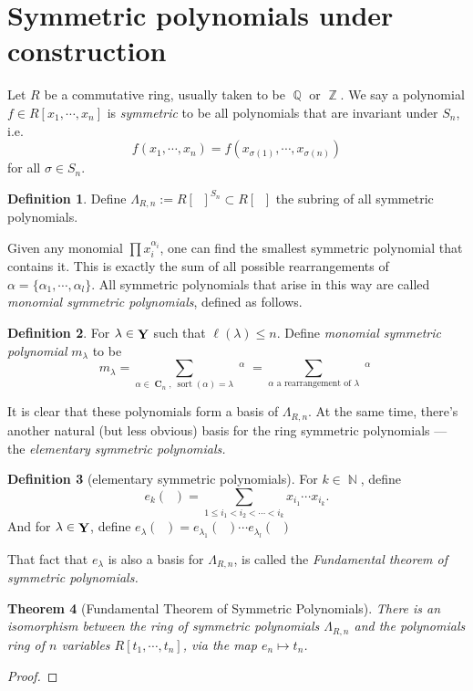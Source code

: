 \documentclass{amsart}
\theoremstyle{plain}
\newtheorem{theorem}{Theorem}[section]
\theoremstyle{definition}
\newtheorem{definition}[theorem]{Definition}
\DeclareMathOperator{\zz}{\mathbb{Z}}
\DeclareMathOperator{\nn}{\mathbb{N}}
\DeclareMathOperator{\yy}{{\bf Y}}
\DeclareMathOperator{\qq}{\mathbb{Q}}
\DeclareMathOperator{\xn}{\textbf{x}_n}
\DeclareMathOperator{\sort}{sort}
\DeclareMathOperator{\comp}{\textbf{C}}
\begin{document}
\section{Symmetric polynomials {\color{red}under construction}}
Let $R$ be a commutative ring, usually taken to be $\qq$ or $\zz$. We say a polynomial $f\in R[x_1,\cdots,x_n]$ is \emph{symmetric} to be all polynomials that are invariant under $S_n$, i.e. 
$$f(x_1,\cdots,x_n)=f(x_{\sigma(1)},\cdots,x_{\sigma(n)})$$
for all $\sigma\in S_n$.

\begin{definition}
	Define $\Lambda_{R,n}:=R[\xn]^{S_n}\subset R[\xn]$ the subring of all symmetric polynomials.
\end{definition}
Given any monomial $\prod x_i^{\alpha_i}$, one can find the smallest symmetric polynomial that contains it. This is exactly the sum of all possible rearrangements of $\alpha=\{\alpha_1,\cdots,\alpha_l\}$. All symmetric polynomials that arise in this way are called \emph{monomial symmetric polynomials}, defined as follows.
\begin{definition}
	For $\lambda\in \yy$ such that $\ell(\lambda)\leq n$. Define \emph{monomial symmetric polynomial} $m_\lambda$ to be
	\[m_\lambda=\sum_{\alpha\in\comp_n,\ \sort(\alpha)= \lambda} \xn^\alpha=\sum_{\alpha\text{ a rearrangement of }\lambda} \xn^\alpha\]
	
\end{definition}
It is clear that these polynomials form a basis of $\Lambda_{R,n}$. At the same time, there's another natural (but less obvious) basis for the ring symmetric polynomials --- the \emph{elementary symmetric polynomials.}
\begin{definition}[elementary symmetric polynomials] For $k\in\nn$, define \[e_k(\xn)=\sum_{1\leq i_1<i_2<\cdots<i_k}x_{i_1}\cdots x_{i_k}.\]
And for $\lambda\in\yy$, define $e_\lambda(\xn)=e_{\lambda_1}(\xn)\cdots e_{\lambda_{l}}(\xn)$
\end{definition}
That fact that $e_\lambda$ is also a basis for $\Lambda_{R,n}$, is called the \emph{Fundamental theorem of symmetric polynomials.}
\begin{theorem}[Fundamental Theorem of Symmetric Polynomials] \label{thm:ftsp}
	There is an isomorphism between the ring of symmetric polynomials $\Lambda_{R,n}$ and the polynomials ring of $n$ variables $R[t_1,\cdots,t_n]$, via the map $e_n\mapsto t_n$.
\end{theorem}
\begin{proof}
	
\end{proof}
\end{document}
